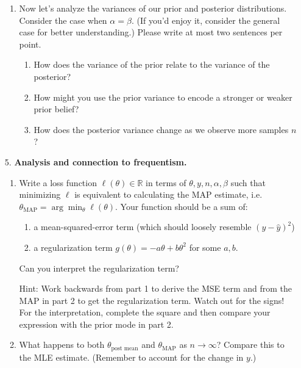 \documentclass[submit]{harvardml}
\begin{document}
\begin{framed}
\begin{enumerate}
\begin{enumerate}
        \item Now let's analyze the variances of our prior and posterior distributions. Consider the case when $\alpha = \beta$. (If you'd enjoy it, consider the general case for better understanding.) Please write at most two sentences per point.
              \begin{enumerate}
                \item How does the variance of the prior relate to the variance of the posterior?
                \item How might you use the prior variance to encode a stronger or weaker prior belief?
                \item How does the posterior variance change as we observe more samples $n$?
              \end{enumerate}
      \end{enumerate}

    \item[5.]
      \textbf{Analysis and connection to frequentism.}

      \begin{enumerate}
        \item
              Write a loss function \(\ell(\theta) \in \mathbb{R}\) in terms of
              \(\theta, y, n, \alpha, \beta\) such that minimizing \(\ell\) is
              equivalent to calculating the MAP estimate,
              i.e.~\(\theta_{\text{MAP}} = \arg \min_{\theta} \ell(\theta)\). Your
              function should be a sum of:
              \begin{enumerate}
                \item a mean-squared-error term (which should loosely resemble $(y - \hat y)^2$)
                \item a
                      regularization term \(g(\theta) = - a \theta + b \theta^{2}\) for some $a, b$.
              \end{enumerate}

              Can you interpret the regularization term?

              Hint: Work backwards from part 1 to derive the MSE term and from the MAP in part 2 to get the regularization term. Watch out for the signs! For the interpretation, complete the square and then compare your expression with the prior mode in part 2.
        \item
              What happens to both $\theta_{\text{post mean}}$ and $\theta_{\text{MAP}}$ as \(n \to \infty\)? Compare this to the MLE estimate.
              (Remember to account for the change in \(y\).)
      \end{enumerate}

  \end{enumerate}

\end{framed}
\end{document}

